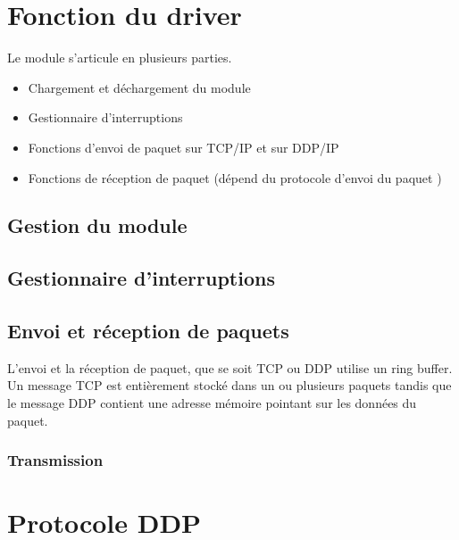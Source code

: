 \newcommand{\TITLE}{Cahier des Charges}



\section{Fonction du driver}

Le module s'articule en plusieurs parties.

\begin{itemize}
\item Chargement et déchargement du module
\item Gestionnaire d'interruptions
\item Fonctions d'envoi de paquet sur TCP/IP et sur DDP/IP
\item Fonctions de réception de paquet (dépend du protocole d'envoi du
paquet )
\end{itemize}

\subsection{Gestion du module}



\subsection{Gestionnaire d'interruptions}

\subsection{Envoi et réception de paquets}

L'envoi et la réception de paquet, que se soit TCP ou DDP utilise un ring
buffer. Un message TCP est entièrement stocké dans un ou plusieurs paquets
tandis que le message DDP contient une adresse mémoire pointant sur les
données du paquet.

\subsubsection{Transmission}




\section{Protocole DDP}




